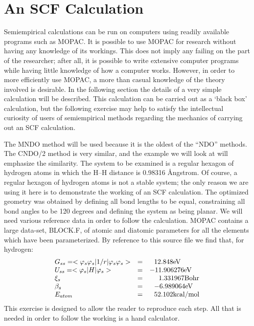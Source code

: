 \section{An SCF Calculation}\label{1scf}
Semiempirical calculations can be run on computers using readily available
programs such as MOPAC. It is possible to use MOPAC for research without having
any knowledge of its workings. This does not imply any failing on the part of
the researcher; after all, it is possible to write extensive computer programs
while having little knowledge of how a computer works. However, in order to
more efficiently use MOPAC, a more than casual knowledge of the theory involved
is desirable. In the following section the details of a very simple calculation
will be described. This calculation can be carried out as a `black box'
calculation, but the following exercise may help to satisfy the intellectual
curiosity of users of semiempirical methods regarding the mechanics of carrying
out an SCF calculation.  

The MNDO method will be used because it is the oldest of the ``NDO''  methods.
The CNDO/2 method is very similar, and the example we will look at will
emphasize the similarity. The system to be examined is a regular hexagon of
hydrogen atoms in which the H--H distance is 0.98316 \AA ngstrom. Of course, a
regular hexagon of hydrogen atoms is not a stable system; the only reason we
are using it here is to demonstrate the working of an SCF calculation. The
optimized geometry was obtained by defining all bond lengths to be equal,
constraining all bond angles to be 120 degrees and defining the system as being
planar. We will need various reference data in order to follow  the calculation. MOPAC contains a large data-set, BLOCK.F, of atomic
and diatomic parameters for all the elements which have been parameterized. By
reference to this source file we find that, for hydrogen:
$$
\begin{array}{lll}
  G_{ss}    = <\varphi_s\varphi_s|1/r|\varphi_s\varphi_s> &=& \ \ 12.848 {\rm eV} \\
  U_{ss}    = <\varphi_s|H|\varphi_s>               &=& -11.906276 {\rm eV }\\
  \xi_s                                       &=& \ \ \ \ 1.331967 {\rm Bohr} \\
  \beta_s                                     &=& \ \ -6.989064 {\rm eV} \\
  E_{atom}                                    &=& \ \ 52.102 {\rm kcal/mol}
\end{array}
$$
This exercise is designed to allow the reader to
reproduce each step. All that is needed in order to follow
the working is a hand calculator.

